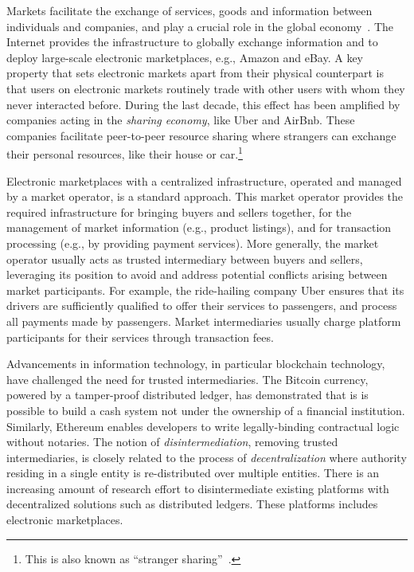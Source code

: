 Markets facilitate the exchange of services, goods and information between individuals and companies, and play a crucial role in the global economy~\cite{bakos1998emerging}.
The Internet provides the infrastructure to globally exchange information and to deploy large-scale electronic marketplaces, e.g., Amazon and eBay.
A key property that sets electronic markets apart from their physical counterpart is that users on electronic markets routinely trade with other users with whom they never interacted before.
During the last decade, this effect has been amplified by companies acting in the \emph{sharing economy}, like Uber and AirBnb.
These companies facilitate peer-to-peer resource sharing where strangers can exchange their personal resources, like their house or car.\footnote{This is also known as \enquote{stranger sharing}~\cite{schor2016debating}.}


Electronic marketplaces with a centralized infrastructure, operated and managed by a market operator, is a standard approach.
This market operator provides the required infrastructure for bringing buyers and sellers together, for the management of market information (e.g., product listings), and for transaction processing (e.g., by providing payment services).
More generally, the market operator usually acts as trusted intermediary between buyers and sellers, leveraging its position to avoid and address potential conflicts arising between market participants.
For example, the ride-hailing company Uber ensures that its drivers are sufficiently qualified to offer their services to passengers, and process all payments made by passengers.
Market intermediaries usually charge platform participants for their services through transaction fees.

Advancements in information technology, in particular blockchain technology, have challenged the need for trusted intermediaries.
The Bitcoin currency, powered by a tamper-proof distributed ledger, has demonstrated that is is possible to build a cash system not under the ownership of a financial institution.
Similarly, Ethereum enables developers to write legally-binding contractual logic without notaries.
The notion of \emph{disintermediation}, removing trusted intermediaries, is closely related to the process of \emph{decentralization} where authority residing in a single entity is re-distributed over multiple entities.
There is an increasing amount of research effort to disintermediate existing platforms with decentralized solutions such as distributed ledgers.
These platforms includes electronic marketplaces.

